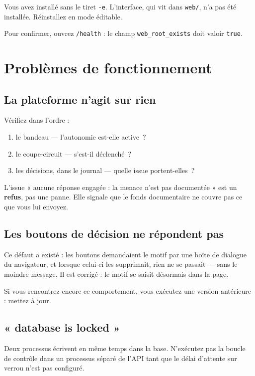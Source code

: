 Vous avez installé sans le tiret \texttt{-e}. L'interface, qui vit dans
\texttt{web/}, n'a pas été installée. Réinstallez en mode éditable.

Pour confirmer, ouvrez \texttt{/health} : le champ \texttt{web\_root\_exists}
doit valoir \texttt{true}.

\section{Problèmes de fonctionnement}

\subsection{La plateforme n'agit sur rien}

Vérifiez dans l'ordre :

\begin{enumerate}[leftmargin=*]
  \item le bandeau — l'autonomie est-elle active~?
  \item le coupe-circuit — s'est-il déclenché~?
  \item les décisions, dans le journal — quelle issue portent-elles~?
\end{enumerate}

L'issue « aucune réponse engagée : la menace n'est pas documentée » est un
\textbf{refus}, pas une panne. Elle signale que le fonds documentaire ne couvre
pas ce que vous lui envoyez.

\subsection{Les boutons de décision ne répondent pas}

Ce défaut a existé : les boutons demandaient le motif par une boîte de dialogue
du navigateur, et lorsque celui-ci les supprimait, rien ne se passait — sans le
moindre message. Il est corrigé : le motif se saisit désormais dans la page.

Si vous rencontrez encore ce comportement, vous exécutez une version
antérieure : mettez à jour.

\subsection{« database is locked »}

Deux processus écrivent en même temps dans la base. N'exécutez pas la boucle de
contrôle dans un processus séparé de l'API tant que le délai d'attente sur
verrou n'est pas configuré.

